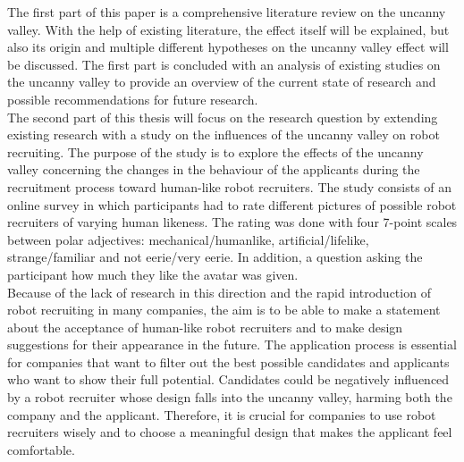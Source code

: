 The first part of this paper is a comprehensive literature review on the uncanny valley. With the help of existing literature, the effect itself will be explained, but also its origin and multiple different hypotheses on the uncanny valley effect will be discussed. The first part is concluded with an analysis of existing studies on the uncanny valley to provide an overview of the current state of research and possible recommendations for future research.\\
The second part of this thesis will focus on the research question by extending existing research with a study on the influences of the uncanny valley on robot recruiting. The purpose of the study is to explore the effects of the uncanny valley concerning the changes in the behaviour of the applicants during the recruitment process toward human-like robot recruiters. The study consists of an online survey in which participants had to rate different pictures of possible robot recruiters of varying human likeness. The rating was done with four 7-point scales between polar adjectives: mechanical/humanlike, artificial/lifelike, strange/familiar and not eerie/very eerie. In addition, a question asking the participant how much they like the avatar was given.\\ 
Because of the lack of research in this direction and the rapid introduction of robot recruiting in many companies, the aim is to be able to make a statement about the acceptance of human-like robot recruiters and to make design suggestions for their appearance in the future. The application process is essential for companies that want to filter out the best possible candidates and applicants who want to show their full potential. Candidates could be negatively influenced by a robot recruiter whose design falls into the uncanny valley, harming both the company and the applicant. Therefore, it is crucial for companies to use robot recruiters wisely and to choose a meaningful design that makes the applicant feel comfortable. 